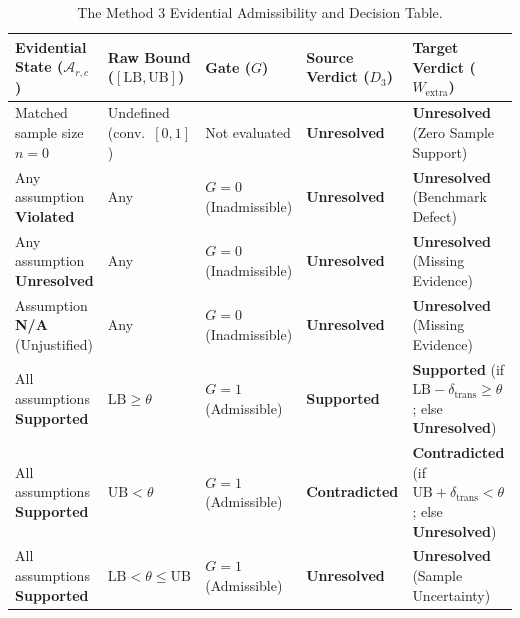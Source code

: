 \documentclass[runningheads]{llncs}
\begin{document}
\begin{table}[t]
\caption{The Method 3 Evidential Admissibility and Decision Table.}
\label{tab:decision_table}
\centering
\scriptsize
\setlength{\tabcolsep}{4pt}
\begin{tabular}{lllll}
\toprule
\textbf{Evidential State ($\mathcal{A}_{r,c}$)} & \textbf{Raw Bound ($[\text{LB}, \text{UB}]$)} & \textbf{Gate ($G$)} & \textbf{Source Verdict ($D_3$)} & \textbf{Target Verdict ($W_{\text{extra}}$)} \\
\midrule
Matched sample size $n = 0$ & Undefined (conv.\ $[0, 1]$) & Not evaluated & \textbf{Unresolved} & \textbf{Unresolved} (Zero Sample Support) \\
Any assumption \textbf{Violated} & Any & $G = 0$ (Inadmissible) & \textbf{Unresolved} & \textbf{Unresolved} (Benchmark Defect) \\
Any assumption \textbf{Unresolved} & Any & $G = 0$ (Inadmissible) & \textbf{Unresolved} & \textbf{Unresolved} (Missing Evidence) \\
Assumption \textbf{N/A} (Unjustified) & Any & $G = 0$ (Inadmissible) & \textbf{Unresolved} & \textbf{Unresolved} (Missing Evidence) \\
All assumptions \textbf{Supported} & $\text{LB} \ge \theta$ & $G = 1$ (Admissible) & \textbf{Supported} & \textbf{Supported} (if $\text{LB} - \delta_{\text{trans}} \ge \theta$; else \textbf{Unresolved}) \\
All assumptions \textbf{Supported} & $\text{UB} < \theta$ & $G = 1$ (Admissible) & \textbf{Contradicted} & \textbf{Contradicted} (if $\text{UB} + \delta_{\text{trans}} < \theta$; else \textbf{Unresolved}) \\
All assumptions \textbf{Supported} & $\text{LB} < \theta \le \text{UB}$ & $G = 1$ (Admissible) & \textbf{Unresolved} & \textbf{Unresolved} (Sample Uncertainty) \\
\bottomrule
\end{tabular}
\end{table}
\end{document}
